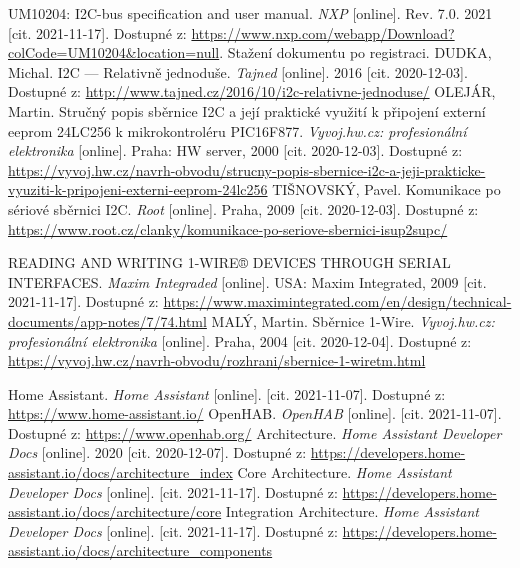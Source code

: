 \begin{thebibliography}{3}
UM10204: I2C-bus specification and user manual. \textit{NXP} [online]. Rev. 7.0. 2021 [cit. 2021-11-17]. Dostupné z: \url{https://www.nxp.com/webapp/Download?colCode=UM10204&location=null}. Stažení dokumentu po registraci.
DUDKA, Michal. I2C --- Relativně jednoduše. \textit{Tajned} [online]. 2016 [cit. 2020-12-03]. Dostupné z: \url{http://www.tajned.cz/2016/10/i2c-relativne-jednoduse/}
OLEJÁR, Martin. Stručný popis sběrnice I2C a její praktické využití k připojení externí eeprom 24LC256 k mikrokontroléru PIC16F877. \textit{Vyvoj.hw.cz: profesionální elektronika} [online]. Praha: HW server, 2000 [cit. 2020-12-03]. Dostupné z: \url{https://vyvoj.hw.cz/navrh-obvodu/strucny-popis-sbernice-i2c-a-jeji-prakticke-vyuziti-k-pripojeni-externi-eeprom-24lc256}
TIŠNOVSKÝ, Pavel. Komunikace po sériové sběrnici I2C. \textit{Root} [online]. Praha, 2009 [cit. 2020-12-03]. Dostupné z: \url{https://www.root.cz/clanky/komunikace-po-seriove-sbernici-isup2supc/}

READING AND WRITING 1-WIRE® DEVICES THROUGH SERIAL INTERFACES. \textit{Maxim Integraded} [online]. USA: Maxim Integrated, 2009 [cit. 2021-11-17]. Dostupné z: \url{https://www.maximintegrated.com/en/design/technical-documents/app-notes/7/74.html}
MALÝ, Martin. Sběrnice 1-Wire. \textit{Vyvoj.hw.cz: profesionální elektronika} [online]. Praha, 2004 [cit. 2020-12-04]. Dostupné z: \url{https://vyvoj.hw.cz/navrh-obvodu/rozhrani/sbernice-1-wiretm.html}

Home Assistant. \textit{Home Assistant} [online]. [cit. 2021-11-07]. Dostupné z: \url{https://www.home-assistant.io/}
OpenHAB. \textit{OpenHAB} [online]. [cit. 2021-11-07]. Dostupné z: \url{https://www.openhab.org/}
Architecture. \textit{Home Assistant Developer Docs} [online]. 2020 [cit. 2020-12-07]. Dostupné z: \url{https://developers.home-assistant.io/docs/architecture\_index}
Core Architecture. \textit{Home Assistant Developer Docs} [online]. [cit. 2021-11-17]. Dostupné z: \url{https://developers.home-assistant.io/docs/architecture/core}
Integration Architecture. \textit{Home Assistant Developer Docs} [online]. [cit. 2021-11-17]. Dostupné z: \url{https://developers.home-assistant.io/docs/architecture_components}


\end{thebibliography}
